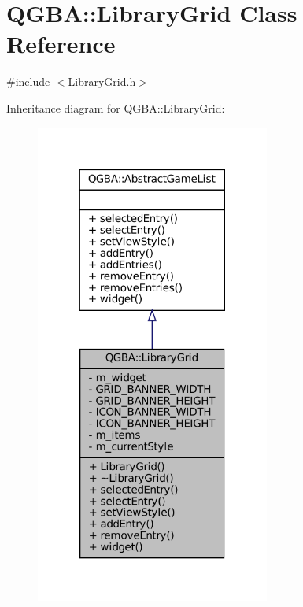 \hypertarget{class_q_g_b_a_1_1_library_grid}{}\section{Q\+G\+BA\+:\+:Library\+Grid Class Reference}
\label{class_q_g_b_a_1_1_library_grid}


{\ttfamily \#include $<$Library\+Grid.\+h$>$}



Inheritance diagram for Q\+G\+BA\+:\+:Library\+Grid\+:
\nopagebreak
\begin{figure}[H]
\begin{center}
\leavevmode
\includegraphics[width=218pt]{class_q_g_b_a_1_1_library_grid__inherit__graph}
\end{center}
\end{figure}


